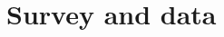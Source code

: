 \documentclass[12pt]{article} %
\begin{document}



\section{Survey and data} \label{sec:survey}
\end{document}
